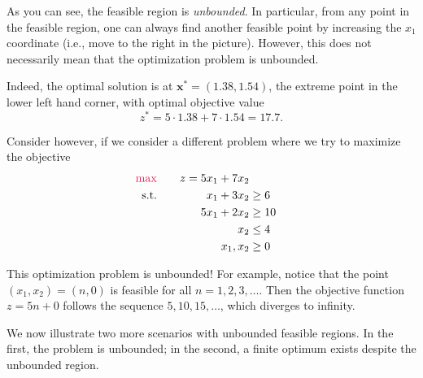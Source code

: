 
As you can see, the feasible region is \emph{unbounded}.  In particular, from any point in the feasible region, one can always find another feasible point by increasing the $x_1$ coordinate (i.e., move to the right in the picture).   However, this does not necessarily mean that the optimization problem is unbounded.

Indeed, the optimal solution is at $\mathbf{x}^* = (1.38, 1.54)$, the extreme point in the lower left hand corner,
with optimal objective value
$$
z^* = 5 \cdot 1.38 + 7\cdot 1.54 = 17.7.
$$

Consider however, if we consider a different problem where we try to maximize the objective
\begin{align*}
{\color{red} \max }\quad && z = 5x_1 + 7x_2  \\
\text{s.t.} \quad && x_1 + 3x_2 &\geq 6 \\
&& 5x_1 + 2x_2 &\geq 10 \\
&& x_2 &\leq 4 \\
&& x_1, x_2 &\geq 0
\end{align*}

\begin{solution}
This optimization problem is unbounded!  For example, notice that the point $(x_1,x_2) = (n,0)$ is feasible for all $n=1,2,3,\dots$.   Then the objective function $z = 5n + 0$ follows the sequence $5, 10, 15, \dots$, which diverges to infinity.
\end{solution}

We now illustrate two more scenarios with unbounded feasible regions. In the first, the problem is unbounded; in the second, a finite optimum exists despite the unbounded region.

